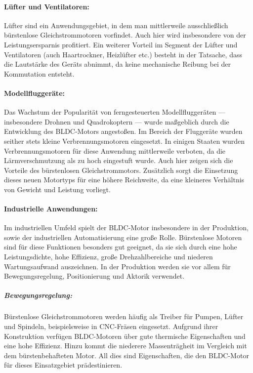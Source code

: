 \paragraph{Lüfter und Ventilatoren:} Lüfter sind ein Anwendungsgebiet, in dem man mittlerweile ausschließlich bürstenlose Gleichstrommotoren vorfindet. Auch hier wird insbesondere von der Leistungsersparnis profitiert. Ein weiterer Vorteil im Segment der Lüfter und Ventilatoren (auch Haartrockner, Heizlüfter etc.) besteht in der Tatsache, dass die Lautstärke des Geräts abnimmt, da keine mechanische Reibung bei der Kommutation entsteht.

\paragraph{Modellfluggeräte:} Das Wachstum der Popularität von ferngesteuerten Modellfluggeräten --- insbesondere Drohnen und Quadrokoptern --- wurde maßgeblich durch die Entwicklung des BLDC-Motors angestoßen. Im Bereich der Fluggeräte wurden seither stets kleine Verbrennungsmotoren eingesetzt. In einigen Staaten wurden Verbrennungsmotoren für diese Anwendung mittlerweile verboten, da die Lärmverschmutzung als zu hoch eingestuft wurde. Auch hier zeigen sich die Vorteile des bürstenlosen Gleichstrommotors. Zusätzlich sorgt die Einsetzung dieses neuen Motortyps für eine höhere Reichweite, da eine kleineres Verhältnis von Gewicht und Leistung vorliegt.

\paragraph{Industrielle Anwendungen:} Im industriellen Umfeld spielt der BLDC-Motor insbesondere in der Produktion, sowie der industriellen Automatisierung eine große Rolle. Bürstenlose Motoren sind für diese Funktionen besonders gut geeignet, da sie sich durch eine hohe Leistungsdichte, hohe Effizienz, große Drehzahlbereiche und niederen Wartungsaufwand auszeichnen. In der Produktion werden sie vor allem für Bewegungsregelung, Positionierung und Aktorik verwendet.

\subparagraph{Bewegungsregelung:} Bürstenlose Gleichstrommotoren werden häufig als Treiber für Pumpen, Lüfter und Spindeln, beispielsweise in CNC-Fräsen eingesetzt. Aufgrund ihrer Konstruktion verfügen BLDC-Motoren über gute thermische Eigenschaften und eine hohe Effizienz. Hinzu kommt die niederere Massenträgheit im Vergleich mit dem bürstenbehafteten Motor. All dies sind Eigenschaften, die den BLDC-Motor für dieses Einsatzgebiet prädestinieren.

